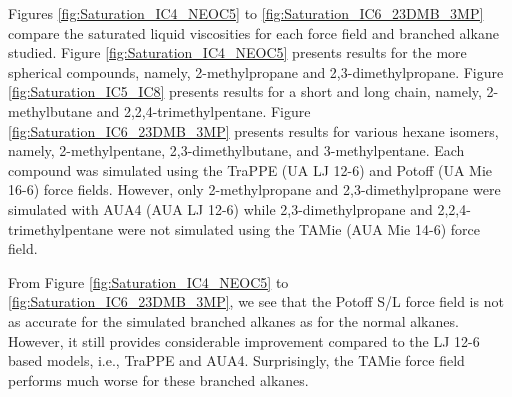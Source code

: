 \documentclass[preprint,review,12pt]{elsarticle}
\begin{document}

Figures \ref{fig:Saturation_IC4_NEOC5} to \ref{fig:Saturation_IC6_23DMB_3MP} compare the saturated liquid viscosities for each force field and branched alkane studied. Figure \ref{fig:Saturation_IC4_NEOC5} presents results for the more spherical compounds, namely, 2-methylpropane and 2,3-dimethylpropane. Figure \ref{fig:Saturation_IC5_IC8} presents results for a short and long chain, namely, 2-methylbutane and 2,2,4-trimethylpentane. Figure \ref{fig:Saturation_IC6_23DMB_3MP} presents results for various hexane isomers, namely, 2-methylpentane, 2,3-dimethylbutane, and 3-methylpentane. Each compound was simulated using the TraPPE (UA LJ 12-6) and Potoff (UA Mie 16-6) force fields. However, only 2-methylpropane and 2,3-dimethylpropane were simulated with AUA4 (AUA LJ 12-6) while 2,3-dimethylpropane and 2,2,4-trimethylpentane were not simulated using the TAMie (AUA Mie 14-6) force field.

From Figure \ref{fig:Saturation_IC4_NEOC5} to \ref{fig:Saturation_IC6_23DMB_3MP}, we see that the Potoff S/L force field is not as accurate for the simulated branched alkanes as for the normal alkanes. However, it still provides considerable improvement compared to the LJ 12-6 based models, i.e., TraPPE and AUA4. Surprisingly, the TAMie force field performs much worse for these branched alkanes. 

\end{document}

